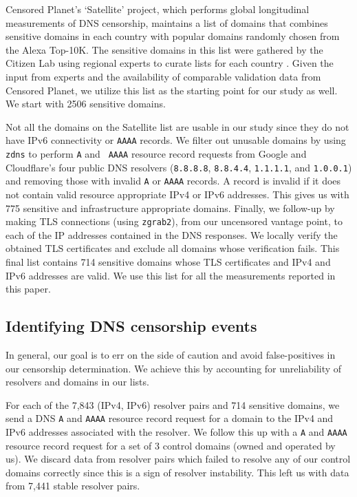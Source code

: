  Censored Planet's `Satellite' project,
which performs global longitudinal measurements of DNS censorship,
\cite{sundara2020censored} maintains a list of domains that combines sensitive
domains in each country with popular domains randomly chosen from the Alexa
Top-10K. The sensitive domains in this list were gathered by the Citizen Lab
using regional experts to curate lists for each country
\cite{citizenlab-blocklists}. Given the input from experts and the availability
of comparable validation data from Censored Planet, we utilize this list as the
starting point for our study as well. We start with 2506 sensitive domains.

 Not all the domains on the Satellite list
are usable in our study since they do not have IPv6 connectivity or {\tt AAAA}
records.
%
We filter out unusable domains by using {\tt zdns} to perform {\tt A} and {\tt
AAAA} resource record requests from Google and Cloudflare's four public DNS
resolvers ({\tt 8.8.8.8}, {\tt 8.8.4.4}, {\tt 1.1.1.1}, and {\tt 1.0.0.1}) and
removing those with invalid {\tt A} or {\tt AAAA} records. A record is invalid
if it does not contain valid resource appropriate IPv4 or IPv6 addresses. This
gives us with 775 sensitive and infrastructure appropriate domains.
%
Finally, we follow-up by making TLS connections (using {\tt zgrab2}), from our
uncensored vantage point, to each of the IP addresses contained in the DNS
responses. We locally verify the obtained TLS certificates and exclude all
domains whose verification fails. 
%
This final list contains 714 sensitive domains whose TLS certificates and IPv4
and IPv6 addresses are valid. We use this list for all the measurements
reported in this paper.

\subsection{Identifying DNS censorship events} \label{sec:methodology:censorship}
In general, our goal is to err on the side of caution and avoid false-positives
in our censorship determination. We achieve this by accounting for
unreliability of resolvers and domains in our lists.

For each of the 7,843 (IPv4, IPv6) resolver pairs and 714 sensitive domains, we
send a DNS {\tt A} and {\tt AAAA} resource record request for a domain to the
IPv4 and IPv6 addresses associated with the resolver. We follow this up with
a {\tt A} and {\tt AAAA} resource record request for a set of 3 control domains
(owned and operated by us).
%
We discard data from resolver pairs which failed to resolve any of our control
domains correctly since this is a sign of resolver instability. This left us
with data from 7,441 stable resolver pairs.
%

